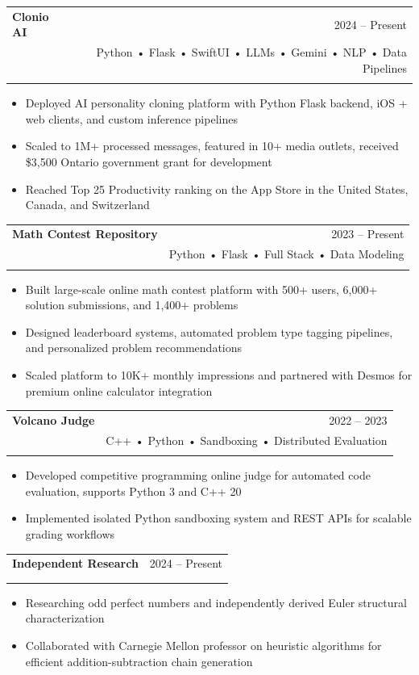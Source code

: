 \documentclass[11pt,letterpaper]{article}
\makeatletter
\newcommand{\resumeItem}[1]{
    \item \small{#1}
}
\newcommand{\project}[5]{
\vspace{0.2em}

\begin{tabularx}{\textwidth}{@{}Xr@{}}
{\textbf{#1}} & {\small \textcolor{muted}{#2}} \\

\ifstrempty{#3}
{}
{
{\small #3} & {\footnotesize \textcolor{muted}{#4}} \\
}

\end{tabularx}

{\small #5}
}
\makeatother
\begin{document}
\project
{Clonio AI}
{2024 -- Present}
{\faAppStore \hspace{0.35em}\href{https://apps.apple.com/us/app/clonio-ai/id6633411608}{App Store}}
{Python • Flask • SwiftUI • LLMs • Gemini • NLP • Data Pipelines}
{
\begin{itemize}
    \resumeItem{Deployed AI personality cloning platform with Python Flask backend, iOS + web clients, and custom inference pipelines}
    \resumeItem{Scaled to 1M+ processed messages, featured in 10+ media outlets, received \$3,500 Ontario government grant for development}
    \resumeItem{Reached Top 25 Productivity ranking on the App Store in the United States, Canada, and Switzerland}
\end{itemize}
}

\project
{Math Contest Repository}
{2023 -- Present}
{\faGlobe \hspace{0.35em}\href{https://mathcontestrepository.pythonanywhere.com}{Live Platform}}
{Python • Flask • Full Stack • Data Modeling}
{
\begin{itemize}
    \resumeItem{Built large-scale online math contest platform with 500+ users, 6,000+ solution submissions, and 1,400+ problems}
    \resumeItem{Designed leaderboard systems, automated problem type tagging pipelines, and personalized problem recommendations}
    \resumeItem{Scaled platform to 10K+ monthly impressions and partnered with Desmos for premium online calculator integration}
\end{itemize}
}

\project
{Volcano Judge}
{2022 -- 2023}
{\faGithub \hspace{0.35em}\href{https://github.com/savirsingh/volcano-judge}{GitHub}}
{C++ • Python • Sandboxing • Distributed Evaluation}
{
\begin{itemize}
    \resumeItem{Developed competitive programming online judge for automated code evaluation, supports Python 3 and C++ 20}
    \resumeItem{Implemented isolated Python sandboxing system and REST APIs for scalable grading workflows}
\end{itemize}
}

\project
{Independent Research}
{2024 -- Present}
{}
{}
{
\begin{itemize}
    \resumeItem{Researching odd perfect numbers and independently derived Euler structural characterization}
    \resumeItem{Collaborated with Carnegie Mellon professor on heuristic algorithms for efficient addition-subtraction chain generation}
\end{itemize}
}
\end{document}
